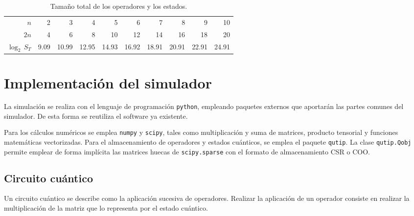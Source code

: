\begin{ejemplo}
\begin{table}[h]
	\centering
	\begin{tabular}{*{10}{r}}
		\toprule
$n$ & 2	& 3	& 4	& 5	& 6	& 7	& 8	& 9	& 10 \\
$2n$& 4	& 6	& 8	& 10	& 12	& 14	& 16	& 18	& 20 \\
$\log_2 \, S_T$ & 9.09	& 10.99	& 12.95	& 14.93	& 16.92	& 18.91	& 20.91	& 22.91	
& 24.91 \\
		\bottomrule
	\end{tabular}
	\caption{Tamaño total de los operadores y los estados.}
\end{table}


\end{ejemplo}

\section{Implementación del simulador}

La simulación se realiza con el lenguaje de programación \texttt{python}, 
empleando paquetes externos que aportarán las partes comunes del simulador. De 
esta forma se reutiliza el software ya existente.

Para los cálculos numéricos se emplea \texttt{numpy} y \texttt{scipy}, tales 
como multiplicación y suma de matrices, producto tensorial y funciones 
matemáticas vectorizadas. Para el almacenamiento de operadores y estados 
cuánticos, se emplea el paquete \texttt{qutip}. La clase \texttt{qutip.Qobj} 
permite emplear de forma implícita las matrices huecas de \texttt{scipy.sparse} 
con el formato de almacenamiento CSR o COO.

%

\subsection{Circuito cuántico}
Un circuito cuántico se describe como la aplicación sucesiva de operadores.  
Realizar la aplicación de un operador consiste en realizar la multiplicación de 
la matriz que lo representa por el estado cuántico.

